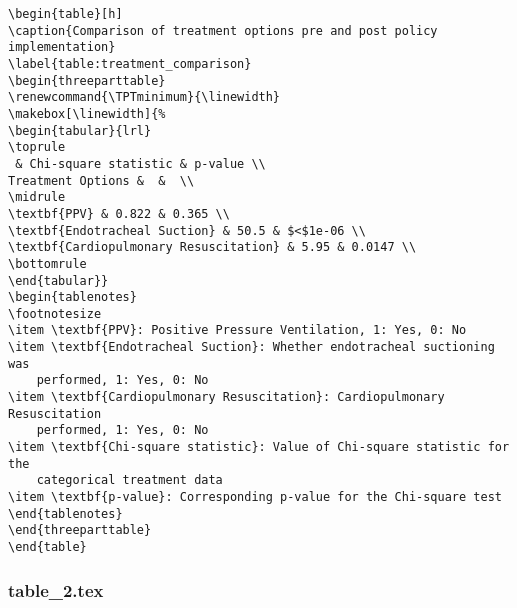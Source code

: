 \documentclass[11pt]{article}
\begin{document}
\begin{Verbatim}[tabsize=4]
\begin{table}[h]
\caption{Comparison of treatment options pre and post policy implementation}
\label{table:treatment_comparison}
\begin{threeparttable}
\renewcommand{\TPTminimum}{\linewidth}
\makebox[\linewidth]{%
\begin{tabular}{lrl}
\toprule
 & Chi-square statistic & p-value \\
Treatment Options &  &  \\
\midrule
\textbf{PPV} & 0.822 & 0.365 \\
\textbf{Endotracheal Suction} & 50.5 & $<$1e-06 \\
\textbf{Cardiopulmonary Resuscitation} & 5.95 & 0.0147 \\
\bottomrule
\end{tabular}}
\begin{tablenotes}
\footnotesize
\item \textbf{PPV}: Positive Pressure Ventilation, 1: Yes, 0: No
\item \textbf{Endotracheal Suction}: Whether endotracheal suctioning was
	performed, 1: Yes, 0: No
\item \textbf{Cardiopulmonary Resuscitation}: Cardiopulmonary Resuscitation
	performed, 1: Yes, 0: No
\item \textbf{Chi-square statistic}: Value of Chi-square statistic for the
	categorical treatment data
\item \textbf{p-value}: Corresponding p-value for the Chi-square test
\end{tablenotes}
\end{threeparttable}
\end{table}

\end{Verbatim}

\subsubsection*{table\_2.tex}
\end{document}
